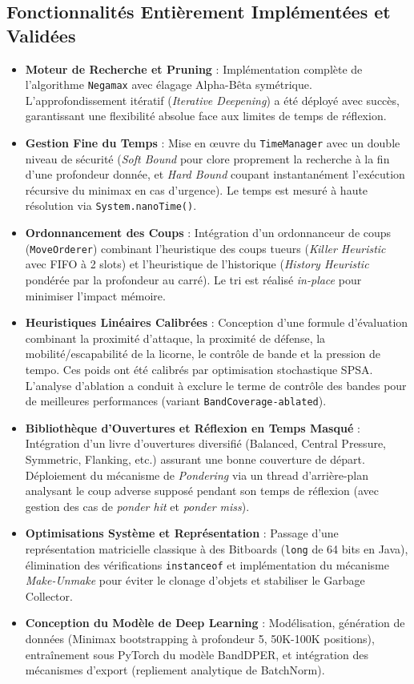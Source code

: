 \documentclass[12pt,a4paper]{article}
\begin{document}
\subsection{Fonctionnalités Entièrement Implémentées et Validées}
\begin{itemize}
    \item \textbf{Moteur de Recherche et Pruning} : Implémentation complète de l'algorithme \texttt{Negamax} avec élagage Alpha-Bêta symétrique. L'approfondissement itératif (\textit{Iterative Deepening}) a été déployé avec succès, garantissant une flexibilité absolue face aux limites de temps de réflexion.
    \item \textbf{Gestion Fine du Temps} : Mise en œuvre du \texttt{TimeManager} avec un double niveau de sécurité (\textit{Soft Bound} pour clore proprement la recherche à la fin d'une profondeur donnée, et \textit{Hard Bound} coupant instantanément l'exécution récursive du minimax en cas d'urgence). Le temps est mesuré à haute résolution via \texttt{System.nanoTime()}.
    \item \textbf{Ordonnancement des Coups} : Intégration d'un ordonnanceur de coups (\texttt{MoveOrderer}) combinant l'heuristique des coups tueurs (\textit{Killer Heuristic} avec FIFO à 2 slots) et l'heuristique de l'historique (\textit{History Heuristic} pondérée par la profondeur au carré). Le tri est réalisé \textit{in-place} pour minimiser l'impact mémoire.
    \item \textbf{Heuristiques Linéaires Calibrées} : Conception d'une formule d'évaluation combinant la proximité d'attaque, la proximité de défense, la mobilité/escapabilité de la licorne, le contrôle de bande et la pression de tempo. Ces poids ont été calibrés par optimisation stochastique SPSA. L'analyse d'ablation a conduit à exclure le terme de contrôle des bandes pour de meilleures performances (variant \texttt{BandCoverage-ablated}).
    \item \textbf{Bibliothèque d'Ouvertures et Réflexion en Temps Masqué} : Intégration d'un livre d'ouvertures diversifié (Balanced, Central Pressure, Symmetric, Flanking, etc.) assurant une bonne couverture de départ. Déploiement du mécanisme de \textit{Pondering} via un thread d'arrière-plan analysant le coup adverse supposé pendant son temps de réflexion (avec gestion des cas de \textit{ponder hit} et \textit{ponder miss}).
    \item \textbf{Optimisations Système et Représentation} : Passage d'une représentation matricielle classique à des Bitboards (\texttt{long} de 64 bits en Java), élimination des vérifications \texttt{instanceof} et implémentation du mécanisme \textit{Make-Unmake} pour éviter le clonage d'objets et stabiliser le Garbage Collector.
    \item \textbf{Conception du Modèle de Deep Learning} : Modélisation, génération de données (Minimax bootstrapping à profondeur 5, 50K-100K positions), entraînement sous PyTorch du modèle BandDPER, et intégration des mécanismes d'export (repliement analytique de BatchNorm).
\end{itemize}
\end{document}
